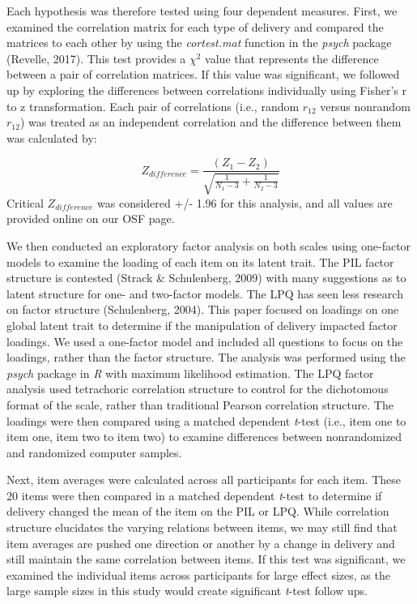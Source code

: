 \documentclass[english,man, mask]{apa6}
\theoremstyle{definition}
\theoremstyle{definition}
\theoremstyle{definition}
\theoremstyle{remark}
\begin{document}
Each hypothesis was therefore tested using four dependent measures.
First, we examined the correlation matrix for each type of delivery and
compared the matrices to each other by using the \emph{cortest.mat}
function in the \emph{psych} package (Revelle, 2017). This test provides
a \(\chi^2\) value that represents the difference between a pair of
correlation matrices. If this value was significant, we followed up by
exploring the differences between correlations individually using
Fisher's r to z transformation. Each pair of correlations (i.e., random
\(r_{12}\) versus nonrandom \(r_{12}\)) was treated as an independent
correlation and the difference between them was calculated by:

\[
Z_{difference} = \frac{(Z_{1} - Z_{2})} { \sqrt{ \frac{1} {N_{1} - 3} + \frac{1} {N_{2} - 3}} }
\] Critical \(Z_{difference}\) was considered +/- 1.96 for this
analysis, and all values are provided online on our OSF page.

We then conducted an exploratory factor analysis on both scales using
one-factor models to examine the loading of each item on its latent
trait. The PIL factor structure is contested (Strack \& Schulenberg,
2009) with many suggestions as to latent structure for one- and
two-factor models. The LPQ has seen less research on factor structure
(Schulenberg, 2004). This paper focused on loadings on one global latent
trait to determine if the manipulation of delivery impacted factor
loadings. We used a one-factor model and included all questions to focus
on the loadings, rather than the factor structure. The analysis was
performed using the \emph{psych} package in \emph{R} with maximum
likelihood estimation. The LPQ factor analysis used tetrachoric
correlation structure to control for the dichotomous format of the
scale, rather than traditional Pearson correlation structure. The
loadings were then compared using a matched dependent \emph{t}-test
(i.e., item one to item one, item two to item two) to examine
differences between nonrandomized and randomized computer samples.

Next, item averages were calculated across all participants for each
item. These 20 items were then compared in a matched dependent
\emph{t}-test to determine if delivery changed the mean of the item on
the PIL or LPQ. While correlation structure elucidates the varying
relations between items, we may still find that item averages are pushed
one direction or another by a change in delivery and still maintain the
same correlation between items. If this test was significant, we
examined the individual items across participants for large effect
sizes, as the large sample sizes in this study would create significant
\emph{t}-test follow ups.
\end{document}
